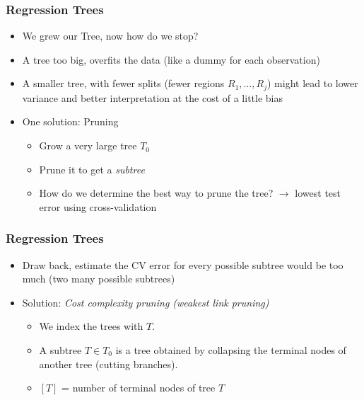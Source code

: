 \documentclass[
  shownotes,
  xcolor={svgnames},
  hyperref={colorlinks,citecolor=DarkBlue,linkcolor=DarkRed,urlcolor=DarkBlue}
  ]{beamer}
\begin{document}
\begin{frame}[fragile]
\frametitle{Regression Trees}
\begin{itemize}
\item We grew our Tree, now how do we stop?

\item A tree too big, overfits the data (like a dummy for each observation)
\item A smaller tree, with fewer splits (fewer regions $R_1,\dots,R_j$) might lead to lower variance and better interpretation at the cost of a little bias
\item One solution: Pruning
\begin{itemize}
 \item Grow a very large tree $T_0$
 \item Prune it to get a {\it subtree}
 \item How do we determine the best way to prune the tree? $\rightarrow$ lowest test error using cross-validation
\end{itemize}

\end{itemize}

\end{frame}
\begin{frame}[fragile]
\frametitle{Regression Trees}

\begin{itemize}
\item Draw back, estimate the CV error for every possible subtree would be too much (two many possible subtrees)
\item Solution: {\it Cost complexity pruning (weakest link pruning)}
\begin{itemize}
    \item We index the trees with $T$.
    \item A subtree $T \in T_0$ is a tree obtained by collapsing the terminal nodes of another tree (cutting branches).
    \item  $[T]$ = number of terminal nodes of tree $T$
\end{itemize}
\end{itemize}
\end{frame}
\end{document}
